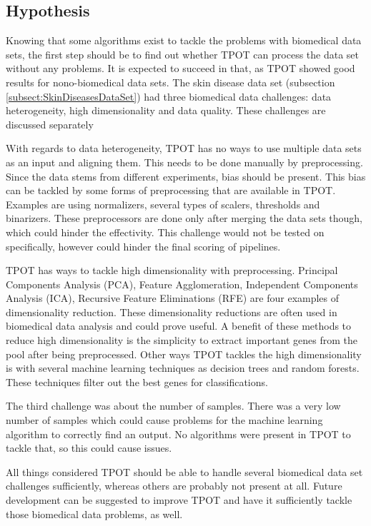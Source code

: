 \documentclass[10pt,a4paper]{article}
\begin{document}
	\subsection{Hypothesis}
	\label{subsec:Hypothesis}
	
	Knowing that some algorithms exist to tackle the problems with biomedical data sets, the first step should be to find out whether TPOT can process the data set without any problems. It is expected to succeed in that, as TPOT showed good results for nono-biomedical data sets. The skin disease data set (subsection \ref{subsect:SkinDiseasesDataSet}) had three biomedical data challenges: data heterogeneity, high dimensionality and data quality. These challenges are discussed separately

	With regards to data heterogeneity, TPOT has no ways to use multiple data sets as an input and aligning them. This needs to be done manually by preprocessing. Since the data stems from different experiments, bias should be present. This bias can be tackled by some forms of preprocessing that are available in TPOT. Examples are using normalizers, several types of scalers, thresholds and binarizers. These preprocessors are done only after merging the data sets though, which could hinder the effectivity. This challenge would not be tested on specifically, however could hinder the final scoring of pipelines.
	
	TPOT has ways to tackle high dimensionality with preprocessing. Principal Components Analysis (PCA), Feature Agglomeration, Independent Components Analysis (ICA), Recursive Feature Eliminations (RFE) are four examples of dimensionality reduction. These dimensionality reductions are often used in biomedical data analysis and could prove useful. A benefit of these methods to reduce high dimensionality is the simplicity to extract important genes from the pool after being preprocessed. Other ways TPOT tackles the high dimensionality is with several machine learning techniques as decision trees and random forests. These techniques filter out the best genes for classifications.
	
	The third challenge was about the number of samples. There was a very low number of samples which could cause problems for the machine learning algorithm to correctly find an output. No algorithms were present in TPOT to tackle that, so this could cause issues.
	
	All things considered TPOT should be able to handle several biomedical data set challenges sufficiently, whereas others are probably not present at all. Future development can be suggested to improve TPOT and have it sufficiently tackle those biomedical data problems, as well.
	
\end{document}
